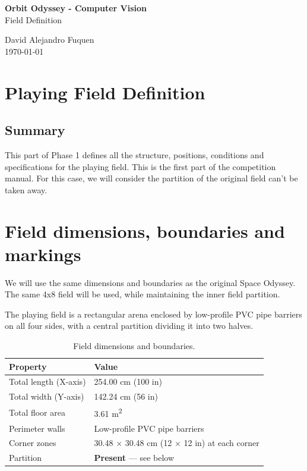 \documentclass[a4]{article}
\begin{document}
\thispagestyle{fancy}

\begin{center}
    \textbf{\large Orbit Odyssey - Computer Vision} \\
    {Field Definition}
    
    \vspace{0.7em}

    David Alejandro Fuquen \\

    {\small \today}

\end{center}

\section*{Playing Field Definition}

\subsection*{Summary}
This part of Phase 1 defines all the structure, positions, conditions and specifications for the playing field. This is the first part of the competition manual. For this case, we will consider the partition of the original field can't be taken away. 


\section*{Field dimensions, boundaries and markings}
We will use the same dimensions and boundaries as the original Space Odyssey. The same 4x8 field will be used, while maintaining the inner field partition. 

The playing field is a rectangular arena enclosed by low-profile PVC pipe barriers on all four sides, with a central partition dividing it into two halves.

\begin{table}[H]
\centering
\begin{tabular}{ll}
\toprule
\textbf{Property} & \textbf{Value} \\
\midrule
Total length (X-axis) & 254.00 cm (100 in) \\
Total width (Y-axis) & 142.24 cm (56 in) \\
Total floor area & 3.61 m\textsuperscript{2} \\
Perimeter walls & Low-profile PVC pipe barriers \\
Corner zones & 30.48 $\times$ 30.48 cm (12 $\times$ 12 in) at each corner \\
Partition & \textbf{Present} --- see below \\
\bottomrule
\end{tabular}
\caption{Field dimensions and boundaries.}
\end{table}
\end{document}
